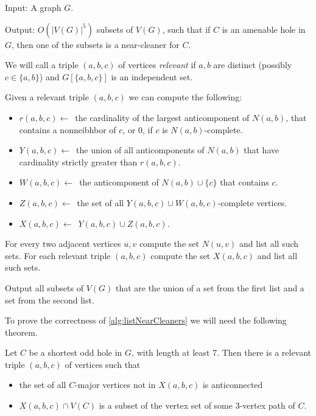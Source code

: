 \begin{alg}
	\label{alg:listNearCleaners}
	Input: A graph $G$.

	\noindent Output: $O(|V(G)|^5)$ subsets of $V(G)$, such that if $C$ is an amenable hole in $G$, then one of the subsets is a near-cleaner for $C$.
\end{alg}
\begin{algtext2}
	We will call a triple $(a, b, c)$ of vertices \emph{relevant} if $a, b$ are distinct (possibly $c \in \{a, b\}$) and $G[\{a,b,c\}]$ is an independent set.

	Given a relevant triple $(a, b, c)$ we can compute the following:
	\begin{itemize}
		\item $r(a,b,c) \leftarrow$~the cardinality of the largest anticomponent of $N(a, b)$, that contains a nonneibhbor of $c$, or 0, if $c$ is $N(a, b)$-complete.
		\item $Y(a,b,c) \leftarrow$~the union of all anticomponents of $N(a, b)$ that have cardinality strictly greater than $r(a, b, c)$.
		\item $W(a, b, c) \leftarrow$~the anticomponent of $N(a,b) \cup \{c\}$ that contains $c$.
		\item $Z(a, b, c) \leftarrow$~the set of all $Y(a, b, c) \cup W(a,b,c)$-complete vertices.
		\item $X(a, b, c) \leftarrow$~$Y(a,b,c) \cup Z(a,b,c)$.
	\end{itemize}

	For every two adjacent vertices $u, v$ compute the set $N(u, v)$ and list all such sets.
	For each relevant triple $(a,b,c)$ compute the set $X(a,b,c)$ and list all such sets.

	Output all subsets of $V(G)$ that are the union of a set from the first list and a set from the second list.
\end{algtext2}

To prove the correctness of \cref{alg:listNearCleaners} we will need the following theorem.

\begin{theorem}[9.1 of \cite{MC05}]
	\label{thm:91}
	Let $C$ be a shortest odd hole in $G$, with length at least 7. Then there is a relevant triple $(a, b, c)$ of vertices such that
	\begin{itemize}
		\item the set of all $C$-major vertices not in $X(a, b, c)$ is anticonnected
		\item $X(a, b, c) \cap V(C)$ is a subset of the vertex set of some 3-vertex path of $C$.
	\end{itemize}
\end{theorem}


